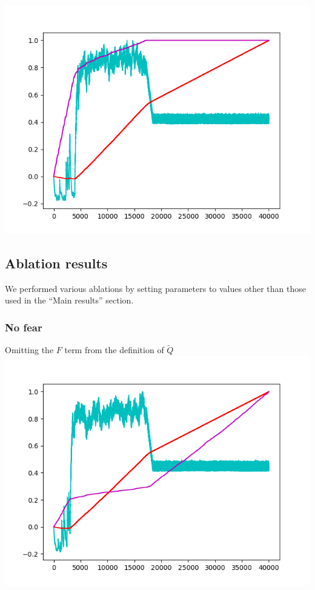 \documentclass{article}
\begin{document}
\includegraphics{borgies.png}

\subsection{Ablation results}

We performed various ablations by setting parameters to values other than those
used in the ``Main results'' section.

\subsubsection{No fear}
Omitting the $F$ term from the definition of $\widetilde{Q}$\\
\includegraphics{borgies_nofear.png}
\end{document}

